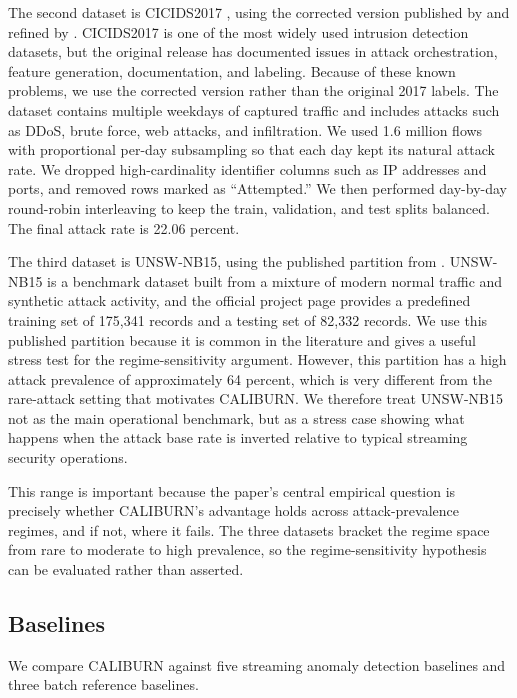 \documentclass[preprint,12pt,authoryear]{elsarticle}
\newcommand{\caliburn}{CALIBURN}
\begin{document}
The second dataset is CICIDS2017 \citep{sharafaldin2018cicids}, using the corrected version published by \citet{engelen2021troubleshooting} and refined by \citet{liu2022errorprevalence}. CICIDS2017 is one of the most widely used intrusion detection datasets, but the original release has documented issues in attack orchestration, feature generation, documentation, and labeling. Because of these known problems, we use the corrected version rather than the original 2017 labels. The dataset contains multiple weekdays of captured traffic and includes attacks such as DDoS, brute force, web attacks, and infiltration. We used 1.6 million flows with proportional per-day subsampling so that each day kept its natural attack rate. We dropped high-cardinality identifier columns such as IP addresses and ports, and removed rows marked as ``Attempted.'' We then performed day-by-day round-robin interleaving to keep the train, validation, and test splits balanced. The final attack rate is 22.06 percent.

The third dataset is UNSW-NB15, using the published partition from \citet{moustafa2015unsw}. UNSW-NB15 is a benchmark dataset built from a mixture of modern normal traffic and synthetic attack activity, and the official project page provides a predefined training set of 175{,}341 records and a testing set of 82{,}332 records. We use this published partition because it is common in the literature and gives a useful stress test for the regime-sensitivity argument. However, this partition has a high attack prevalence of approximately 64 percent, which is very different from the rare-attack setting that motivates \caliburn{}. We therefore treat UNSW-NB15 not as the main operational benchmark, but as a stress case showing what happens when the attack base rate is inverted relative to typical streaming security operations.

This range is important because the paper's central empirical question is precisely whether \caliburn{}'s advantage holds across attack-prevalence regimes, and if not, where it fails. The three datasets bracket the regime space from rare to moderate to high prevalence, so the regime-sensitivity hypothesis can be evaluated rather than asserted.

\subsection{Baselines}
\label{sec:exp-baselines}

We compare \caliburn{} against five streaming anomaly detection baselines and three batch reference baselines.
\end{document}
